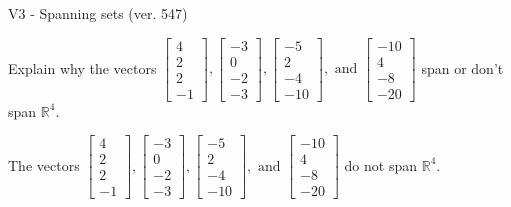 \begin{exercise}
  \begin{exerciseTitle}V3 - Spanning sets (ver. 547)\end{exerciseTitle}
  \begin{exerciseStatement}
    Explain why the vectors \(\left[\begin{array}{r}
4 \\
2 \\
2 \\
-1
\end{array}\right] , \left[\begin{array}{r}
-3 \\
0 \\
-2 \\
-3
\end{array}\right] , \left[\begin{array}{r}
-5 \\
2 \\
-4 \\
-10
\end{array}\right] , \text{ and } \left[\begin{array}{r}
-10 \\
4 \\
-8 \\
-20
\end{array}\right]\) span or don't span \(\mathbb{R}^4\). 
	


  \end{exerciseStatement}
  \begin{exerciseAnswer}
   The vectors \(\left[\begin{array}{r}
4 \\
2 \\
2 \\
-1
\end{array}\right] , \left[\begin{array}{r}
-3 \\
0 \\
-2 \\
-3
\end{array}\right] , \left[\begin{array}{r}
-5 \\
2 \\
-4 \\
-10
\end{array}\right] , \text{ and } \left[\begin{array}{r}
-10 \\
4 \\
-8 \\
-20
\end{array}\right]\) 
  	 do not  
	span \(\mathbb{R}^4\).
  


  \end{exerciseAnswer}
\end{exercise}